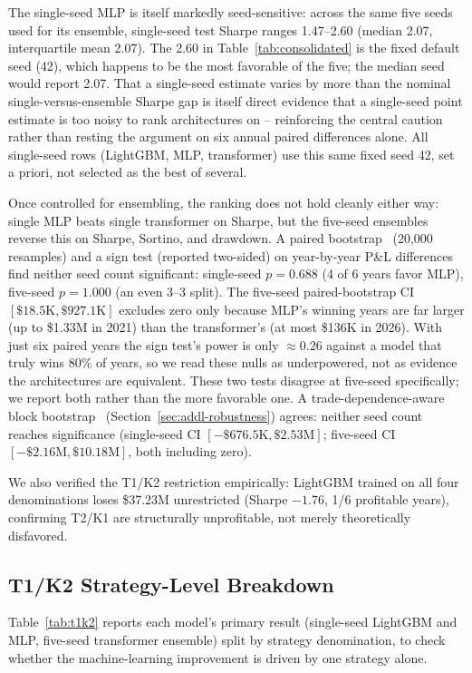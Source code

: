 \documentclass[sigconf,review,anonymous]{acmart}
\begin{document}
The single-seed MLP is itself markedly seed-sensitive: across the same five seeds used for its ensemble, single-seed test Sharpe ranges 1.47--2.60 (median 2.07, interquartile mean 2.07). The 2.60 in Table~\ref{tab:consolidated} is the fixed default seed (42), which happens to be the most favorable of the five; the median seed would report 2.07. That a single-seed estimate varies by more than the nominal single-versus-ensemble Sharpe gap is itself direct evidence that a single-seed point estimate is too noisy to rank architectures on -- reinforcing the central caution rather than resting the argument on six annual paired differences alone. All single-seed rows (LightGBM, MLP, transformer) use this same fixed seed 42, set a priori, not selected as the best of several.

Once controlled for ensembling, the ranking does not hold cleanly either way: single MLP beats single transformer on Sharpe, but the five-seed ensembles reverse this on Sharpe, Sortino, and drawdown. A paired bootstrap~\cite{efron1993bootstrap} (20{,}000 resamples) and a sign test (reported two-sided) on year-by-year P\&L differences find neither seed count significant: single-seed $p=0.688$ (4 of 6 years favor MLP), five-seed $p=1.000$ (an even 3--3 split). The five-seed paired-bootstrap CI $[\$18.5\text{K}, \$927.1\text{K}]$ excludes zero only because MLP's winning years are far larger (up to \$1.33M in 2021) than the transformer's (at most \$136K in 2026). With just six paired years the sign test's power is only $\approx0.26$ against a model that truly wins 80\% of years, so we read these nulls as underpowered, not as evidence the architectures are equivalent. These two tests disagree at five-seed specifically; we report both rather than the more favorable one. A trade-dependence-aware block bootstrap~\cite{kunsch1989} (Section~\ref{sec:addl-robustness}) agrees: neither seed count reaches significance (single-seed CI $[-\$676.5\text{K}, \$2.53\text{M}]$; five-seed CI $[-\$2.16\text{M}, \$10.18\text{M}]$, both including zero).

We also verified the T1/K2 restriction empirically: LightGBM trained on all four denominations loses \$37.23M unrestricted (Sharpe $-1.76$, 1/6 profitable years), confirming T2/K1 are structurally unprofitable, not merely theoretically disfavored.

\subsection{T1/K2 Strategy-Level Breakdown}
\label{sec:t1k2breakdown}
Table~\ref{tab:t1k2} reports each model's primary result (single-seed LightGBM and MLP, five-seed transformer ensemble) split by strategy denomination, to check whether the machine-learning improvement is driven by one strategy alone.
\end{document}
